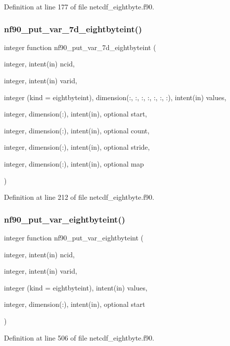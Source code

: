 Definition at line 177 of file netcdf\+\_\+eightbyte.\+f90.

\mbox{\label{netcdf__eightbyte_8f90_a51868f926ef0b973025994cd6c505ceb}} 
\subsubsection{\texorpdfstring{nf90\+\_\+put\+\_\+var\+\_\+7d\+\_\+eightbyteint()}{nf90\_put\_var\_7d\_eightbyteint()}}
{\footnotesize\ttfamily integer function nf90\+\_\+put\+\_\+var\+\_\+7d\+\_\+eightbyteint (\begin{DoxyParamCaption}\item[{integer, intent(in)}]{ncid,  }\item[{integer, intent(in)}]{varid,  }\item[{integer (kind = eightbyteint), dimension(\+:, \+:, \+:, \+:, \+:, \+:, \+:), intent(in)}]{values,  }\item[{integer, dimension(\+:), intent(in), optional}]{start,  }\item[{integer, dimension(\+:), intent(in), optional}]{count,  }\item[{integer, dimension(\+:), intent(in), optional}]{stride,  }\item[{integer, dimension(\+:), intent(in), optional}]{map }\end{DoxyParamCaption})}



Definition at line 212 of file netcdf\+\_\+eightbyte.\+f90.

\mbox{\label{netcdf__eightbyte_8f90_a19465ca23067ad30103744429fb4bb95}} 
\subsubsection{\texorpdfstring{nf90\+\_\+put\+\_\+var\+\_\+eightbyteint()}{nf90\_put\_var\_eightbyteint()}}
{\footnotesize\ttfamily integer function nf90\+\_\+put\+\_\+var\+\_\+eightbyteint (\begin{DoxyParamCaption}\item[{integer, intent(in)}]{ncid,  }\item[{integer, intent(in)}]{varid,  }\item[{integer (kind = eightbyteint), intent(in)}]{values,  }\item[{integer, dimension(\+:), intent(in), optional}]{start }\end{DoxyParamCaption})}



Definition at line 506 of file netcdf\+\_\+eightbyte.\+f90.

